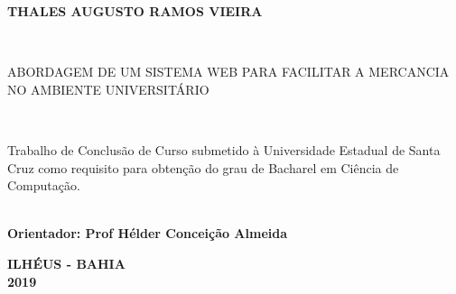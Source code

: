 
\begin{center}

    {\large \begin{large} \bfseries THALES AUGUSTO RAMOS VIEIRA \end{large}\\}
    \vspace{8cm}
    {\large\bfseries{\begin{large}ABORDAGEM DE UM SISTEMA WEB PARA FACILITAR A MERCANCIA NO AMBIENTE UNIVERSITÁRIO \end{large}}\\}
    \vspace{1cm}
    \hspace{.45\linewidth}
    \begin{minipage}{.50\linewidth}

    Trabalho de Conclusão de Curso submetido à Universidade Estadual de Santa Cruz como requisito para obtenção do grau de Bacharel em Ciência de Computação. 

            \textbf{\\ Orientador: Prof Hélder Conceição Almeida}
           
    
    \end{minipage}

    \vspace{2cm}
    \vfill
    {\large\bfseries{ ILHÉUS - BAHIA \\ 2019}}
\end{center}

